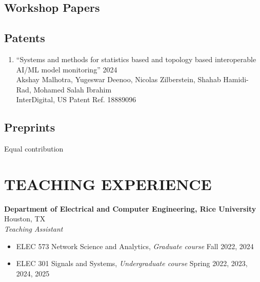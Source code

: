 \documentclass[a4paper,9pt]{extarticle}
\begin{document}
\subsection*{Workshop Papers}
\begin{enumerate}[start=1,label={[W\arabic*]},itemsep=\baselineskip]
    \item {}
    \item {}
\end{enumerate}


\subsection*{Patents}
\begin{enumerate}
    \item ``Systems and methods for statistics based and topology based interoperable AI/ML model monitoring'' \hfill 2024\\
    Akshay Malhotra, Yugeswar Deenoo, Nicolas Zilberstein, Shahab Hamidi-Rad, Mohamed Salah Ibrahim\\
    InterDigital, US Patent Ref. 18889096
    
\end{enumerate}


\subsection*{Preprints}

\begin{enumerate}[start=1,label={[P\arabic*]},itemsep=\baselineskip]
    \item {}
\end{enumerate}

\noindent *Equal contribution


\section*{TEACHING EXPERIENCE}
\noindent
\textbf{Department of Electrical and Computer Engineering, Rice University} \hfill Houston, TX\\ %
\textit{Teaching Assistant} %
\begin{itemize}
    \item ELEC 573 Network Science and Analytics, \textit{Graduate course} \hfill Fall 2022, 2024
    \item ELEC 301 Signals and Systems, \textit{Undergraduate course} \hfill Spring 2022, 2023, 2024, 2025
\end{itemize}
\end{document}
